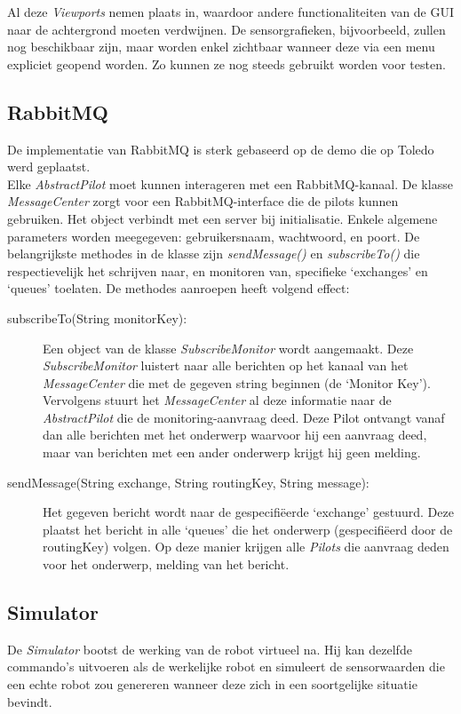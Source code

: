 \documentclass[tt1]{penoverslag}
\begin{document}
Al deze \textit{Viewports} nemen plaats in, waardoor andere functionaliteiten van de GUI naar de achtergrond moeten verdwijnen. De sensorgrafieken, bijvoorbeeld, zullen nog beschikbaar zijn, maar worden enkel zichtbaar wanneer deze via een menu expliciet geopend worden. Zo kunnen ze nog steeds gebruikt worden voor testen.



\subsection{RabbitMQ}
\label{ssec:RabbMQ}
De implementatie van RabbitMQ \cite{RabbitMQ} is sterk gebaseerd op de demo die op Toledo werd geplaatst.\\

Elke \textit{AbstractPilot} moet kunnen interageren met een RabbitMQ-kanaal. De klasse \textit{MessageCenter} zorgt voor een RabbitMQ-interface die de pilots kunnen gebruiken. Het object verbindt met een server bij initialisatie. Enkele algemene parameters worden meegegeven: gebruikersnaam, wachtwoord, en poort. De belangrijkste methodes in de klasse zijn \textit{sendMessage()} en \textit{subscribeTo()} die respectievelijk het schrijven naar, en monitoren van, specifieke `exchanges' en `queues' toelaten. De methodes aanroepen heeft volgend effect:

\begin{description}
\item[subscribeTo(String monitorKey):] Een object van de klasse \textit{SubscribeMonitor} wordt aangemaakt. Deze \textit{SubscribeMonitor} luistert naar alle berichten op het kanaal van het \textit{MessageCenter} die met de gegeven string beginnen (de `Monitor Key'). Vervolgens stuurt het \textit{MessageCenter} al deze informatie naar de \textit{AbstractPilot} die de monitoring-aanvraag deed. Deze Pilot ontvangt vanaf dan alle berichten met het onderwerp waarvoor hij een aanvraag deed, maar van berichten met een ander onderwerp krijgt hij geen melding.
\item[sendMessage(String exchange, String routingKey, String message):] Het gegeven bericht wordt naar de gespecifi\"eerde `exchange' gestuurd. Deze plaatst het bericht in alle `queues' die het onderwerp (gespecifi\"eerd door de routingKey) volgen. Op deze manier krijgen alle \textit{Pilots} die aanvraag deden voor het onderwerp, melding van het bericht.
\end{description}

\subsection{Simulator}
\label{ssec:Sim}
De \textit{Simulator} bootst de werking van de robot virtueel na. Hij kan dezelfde commando's uitvoeren als de werkelijke robot en simuleert de sensorwaarden die een echte robot zou genereren wanneer deze zich in een soortgelijke situatie bevindt.\\
\end{document}
